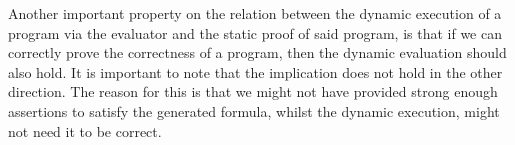 



Another important property on the relation between the dynamic execution of a program via the evaluator and the static proof of said program, is that if we can correctly prove the correctness of a program, then the dynamic evaluation should also hold. It is important to note that the implication does not hold in the other direction. The reason for this is that we might not have provided strong enough assertions to satisfy the generated formula, whilst the dynamic execution, might not need it to be correct.

